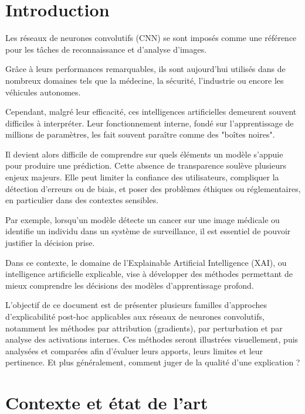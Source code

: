 \documentclass{ir}
\affiliation{
    \affil{1}Université de Lorraine\\
    UFR MIM\\
    3 Rue Augustin Fresnel, 57070 Metz\\
    hugo.schmitt3@etu.univ-lorraine.fr\\
    \affil{2}Université de Lorraine\\
    UFR MIM\\
    3 Rue Augustin Fresnel, 57070 Metz\\
    antonin.leroy9@etu.univ-lorraine.fr
}
\begin{document}
\clearpage

\section{Introduction}\label{sec:intro}

Les réseaux de neurones convolutifs (CNN) se sont imposés comme une référence pour les tâches de reconnaissance et d'analyse d'images.

Grâce à leurs performances remarquables, ils sont aujourd'hui utilisés dans de nombreux domaines tels que la médecine, la sécurité, l'industrie ou encore les véhicules autonomes.

Cependant, malgré leur efficacité, ces intelligences artificielles demeurent souvent difficiles à interpréter.
Leur fonctionnement interne, fondé sur l'apprentissage de millions de paramètres, les fait souvent paraître comme des "boîtes noires".

Il devient alors difficile de comprendre sur quels éléments un modèle s'appuie pour produire une prédiction.
Cette absence de transparence soulève plusieurs enjeux majeurs.
Elle peut limiter la confiance des utilisateurs, compliquer la détection d'erreurs ou de biais, et poser des problèmes éthiques ou réglementaires, en particulier dans des contextes sensibles.

Par exemple, lorsqu'un modèle détecte un cancer sur une image médicale ou identifie un individu dans un système de surveillance, il est essentiel de pouvoir justifier la décision prise.

Dans ce contexte, le domaine de l'Explainable Artificial Intelligence (XAI), ou intelligence artificielle explicable, vise à développer des méthodes permettant de mieux comprendre les décisions des modèles d'apprentissage profond.

L'objectif de ce document est de présenter plusieurs familles d'approches d'explicabilité post-hoc applicables aux réseaux de neurones convolutifs, notamment les méthodes par attribution (gradients), par perturbation et par analyse des activations internes.
Ces méthodes seront illustrées visuellement, puis analysées et comparées afin d'évaluer leurs apports, leurs limites et leur pertinence.
Et plus généralement, comment juger de la qualité d'une explication ?


\section{Contexte et état de l'art}\label{sec:contexte_sota}
\end{document}
